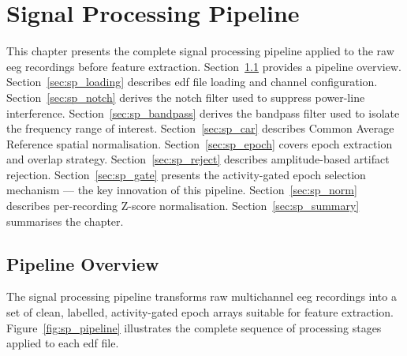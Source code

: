 \chapter{Signal Processing Pipeline}
\label{ch:signal_processing}

This chapter presents the complete signal processing pipeline
applied to the raw \acrshort{eeg} recordings before feature
extraction. Section~\ref{sec:sp_overview} provides a pipeline
overview. Section~\ref{sec:sp_loading} describes \acrshort{edf}
file loading and channel configuration. Section~\ref{sec:sp_notch}
derives the notch filter used to suppress power-line interference.
Section~\ref{sec:sp_bandpass} derives the bandpass filter used
to isolate the frequency range of interest. Section~\ref{sec:sp_car}
describes Common Average Reference spatial normalisation.
Section~\ref{sec:sp_epoch} covers epoch extraction and overlap
strategy. Section~\ref{sec:sp_reject} describes amplitude-based
artifact rejection. Section~\ref{sec:sp_gate} presents the
activity-gated epoch selection mechanism — the key innovation
of this pipeline. Section~\ref{sec:sp_norm} describes per-recording
Z-score normalisation. Section~\ref{sec:sp_summary} summarises
the chapter.

\section{Pipeline Overview}
\label{sec:sp_overview}

The signal processing pipeline transforms raw multichannel
\acrshort{eeg} recordings into a set of clean, labelled, 
activity-gated epoch arrays suitable for feature extraction.
Figure~\ref{fig:sp_pipeline} illustrates the complete sequence
of processing stages applied to each \acrshort{edf} file.

